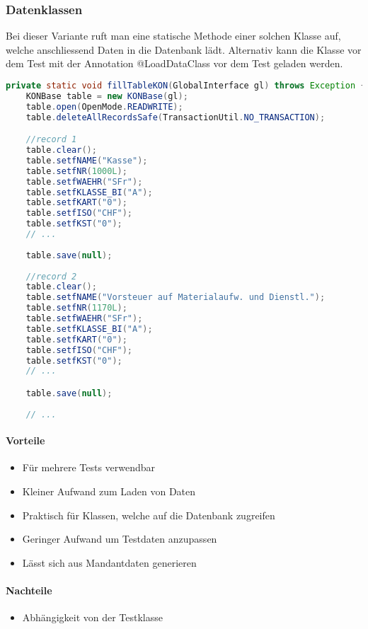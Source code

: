 \subsubsection{Datenklassen} \label{Datenklasse}
Bei dieser Variante ruft man eine statische Methode einer solchen Klasse auf, welche anschliessend Daten in die Datenbank lädt. Alternativ kann die Klasse vor dem Test mit der Annotation @LoadDataClass vor dem Test geladen werden.
\begin{lstlisting}[language=Java, caption=Beispiel einer Datenklasse]
private static void fillTableKON(GlobalInterface gl) throws Exception {
	KONBase table = new KONBase(gl);
	table.open(OpenMode.READWRITE);
	table.deleteAllRecordsSafe(TransactionUtil.NO_TRANSACTION);

	//record 1
	table.clear();
	table.setfNAME("Kasse");
	table.setfNR(1000L);
	table.setfWAEHR("SFr");
	table.setfKLASSE_BI("A");
	table.setfKART("0");
	table.setfISO("CHF");
	table.setfKST("0");
	// ...
	
	table.save(null);
	
	//record 2
	table.clear();
	table.setfNAME("Vorsteuer auf Materialaufw. und Dienstl.");
	table.setfNR(1170L);
	table.setfWAEHR("SFr");
	table.setfKLASSE_BI("A");
	table.setfKART("0");
	table.setfISO("CHF");
	table.setfKST("0");
	// ...

	table.save(null);
	
	// ...
\end{lstlisting}
\paragraph{Vorteile}
\begin{itemize}
\item Für mehrere Tests verwendbar
\item Kleiner Aufwand zum Laden von Daten
\item Praktisch für Klassen, welche auf die Datenbank zugreifen
\item Geringer Aufwand um Testdaten anzupassen
\item Lässt sich aus Mandantdaten generieren
\end{itemize}
\paragraph{Nachteile}
\begin{itemize}
\item Abhängigkeit von der Testklasse
\end{itemize}

